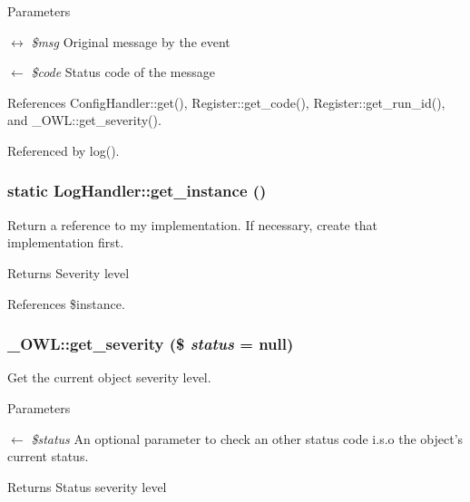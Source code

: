 \begin{DoxyParams}{Parameters}
\item[\mbox{$\leftrightarrow$} {\em \$msg}]Original message by the event \item[\mbox{$\leftarrow$} {\em \$code}]Status code of the message \end{DoxyParams}


References ConfigHandler::get(), Register::get\_\-code(), Register::get\_\-run\_\-id(), and \_\-OWL::get\_\-severity().



Referenced by log().

\subsubsection[{get\_\-instance}]{\setlength{\rightskip}{0pt plus 5cm}static LogHandler::get\_\-instance ()}\label{classLogHandler_aff978ec836c28d7b6e08a84802aa1c6d}
Return a reference to my implementation. If necessary, create that implementation first.

\begin{DoxyReturn}{Returns}
Severity level 
\end{DoxyReturn}


References \$instance.

\subsubsection[{get\_\-severity}]{\setlength{\rightskip}{0pt plus 5cm}\_\-OWL::get\_\-severity (\$ {\em status} = {\ttfamily null})}\label{class__OWL_adf9509ef96858be7bdd9414c5ef129aa}
Get the current object severity level.


\begin{DoxyParams}{Parameters}
\item[\mbox{$\leftarrow$} {\em \$status}]An optional parameter to check an other status code i.s.o the object's current status. \end{DoxyParams}
\begin{DoxyReturn}{Returns}
Status severity level 
\end{DoxyReturn}


